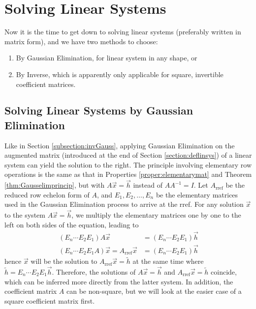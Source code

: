\section{Solving Linear Systems}
\label{section:SolveLinSys}
Now it is the time to get down to solving linear systems (preferably written in matrix form), and we have two methods to choose:
\begin{enumerate}
\item By Gaussian Elimination, for linear system in any shape, or
\item By Inverse, which is apparently only applicable for square, invertible coefficient matrices.
\end{enumerate}

\subsection{Solving Linear Systems by Gaussian Elimination}
\label{subsection:SolLinSysGauss}

Like in Section \ref{subsection:invGauss}, applying Gaussian Elimination on the augmented matrix (introduced at the end of Section \ref{section:deflinsys}) of a linear system can yield the solution to the right. The principle involving elementary row operations is the same as that in Properties \ref{proper:elementarymat} and Theorem \ref{thm:Gausselimprincip}, but with $A\vec{x} = \vec{h}$ instead of $AA^{-1} = I$. Let $A_{\text{rref}}$ be the reduced row echelon form of $A$, and $E_1, E_2, \ldots, E_n$ be the elementary matrices used in the Gaussian Elimination process to arrive at the rref. For any solution $\vec{x}$ to the system $A\vec{x} = \vec{h}$, we multiply the elementary matrices one by one to the left on both sides of the equation, leading to
\begin{align*}
(E_n\cdots E_2E_1)A\vec{x} &= (E_n\cdots E_2E_1)\vec{h} \\
(E_n\cdots E_2E_1A)\vec{x} = A_{\text{rref}}\vec{x} &= (E_n\cdots E_2E_1)\vec{h} 
\end{align*}
hence $\vec{x}$ will be the solution to $A_{\text{rref}}\vec{x} = \tilde{h}$ at the same time where $\tilde{h} = E_n\cdots E_2E_1\vec{h}$. Therefore, the solutions of $A\vec{x} = \vec{h}$ and $A_{\text{rref}}\vec{x} = \tilde{h}$ coincide, which can be inferred more directly from the latter system. In addition, the coefficient matrix $A$ can be non-square, but we will look at the easier case of a square coefficient matrix first.

